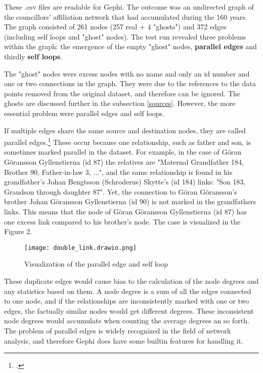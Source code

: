 These .csv files are readable for Gephi. The outcome was an undirected graph of the councillors' affiliation network that had accumulated during the 160 years. The graph consisted of 261 nodes (257 real + 4 "ghosts") and 372 edges (including self loops and "ghost" nodes). The test run revealed three problems within the graph: the emergence of the empty "ghost" nodes, \textbf{parallel edges} and thirdly \textbf{self loops}. 

The "ghost" nodes were excess nodes with no name and only an id number and one or two connections in the graph. They were due to the references to the data points removed from the original dataset, and therefore can be ignored. The ghosts are discussed further in the subsection \ref{sources}. However, the more essential problem were parallel edges and self loops.

If multiple edges share the same source and destination nodes, they are called parallel edges.\footcite[pp. 14-15.]{RajPM2018} These occur because one relationship, such as father and son, is sometimes marked parallel in the dataset. For example, in the case of Göran Göransson Gyllenstierna (id 87) the relatives are "Maternal Grandfather 184, Brother 90, Father-in-law 3, ...", and the same relationship is found in his grandfather's Johan Bengtsson (Schroderus) Skytte's (id 184) links: "Son 183, Grandson through daughter 87". Yet, the connection to Göran Göransson's brother Johan Göransson Gyllenstierna (id 90) is not marked in the grandfathers links. This means that the node of Göran Göransson Gyllenstierna (id 87) has one excess link compared to his brother's node. The case is visualized in the Figure 2.

\begin{figure}[h]
	\texttt{[image: double\_link.drawio.png]}
	\centering
	\caption{Visualization of the parallel edge and self loop} 
	\centering
\end{figure}

These duplicate edges would cause bias to the calculation of the node degrees and any statistics based on them. A node degree is a sum of all the edges connected to one node, and if the relationships are inconsistently marked with one or two edges, the factually similar nodes would get different degrees. These inconsistent node degrees would accumulate when counting the average degrees an so forth. The problem of parallel edges is widely recognized in the field of network analysis, and therefore Gephi does have some builtin features for handling it.

